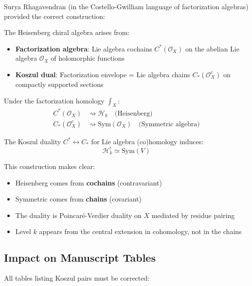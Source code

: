 Surya Rhagavendran (in the Costello-Gwilliam language of factorization algebras) provided 
the correct construction:

\begin{theorem}
\label{thm:rhagavendran-heisenberg}
The Heisenberg chiral algebra arises from:
\begin{itemize}
\item \textbf{Factorization algebra}: Lie algebra cochains $C^*(\mathcal{O}_X)$ on the 
      abelian Lie algebra $\mathcal{O}_X$ of holomorphic functions
\item \textbf{Koszul dual}: Factorization envelope = Lie algebra chains $C_*(\mathcal{O}_X^c)$ 
      on compactly supported sections
\end{itemize}

Under the factorization homology $\int_X$:
\begin{align*}
C^*(\mathcal{O}_X) &\rightsquigarrow \mathcal{H}_k \quad \text{(Heisenberg)} \\
C_*(\mathcal{O}_X^c) &\rightsquigarrow \text{Sym}(\mathcal{O}_X) \quad \text{(Symmetric algebra)}
\end{align*}

The Koszul duality $C^* \leftrightarrow C_*$ for Lie algebra (co)homology induces:
$$\mathcal{H}_k^! \simeq \text{Sym}(V)$$
\end{theorem}

This construction makes clear:
\begin{itemize}
\item Heisenberg comes from \textbf{cochains} (contravariant)
\item Symmetric comes from \textbf{chains} (covariant)
\item The duality is Poincaré-Verdier duality on $X$ mediated by residue pairing
\item Level $k$ appears from the central extension in cohomology, not in the chains
\end{itemize}

\subsection{Impact on Manuscript Tables}

All tables listing Koszul pairs must be corrected:

